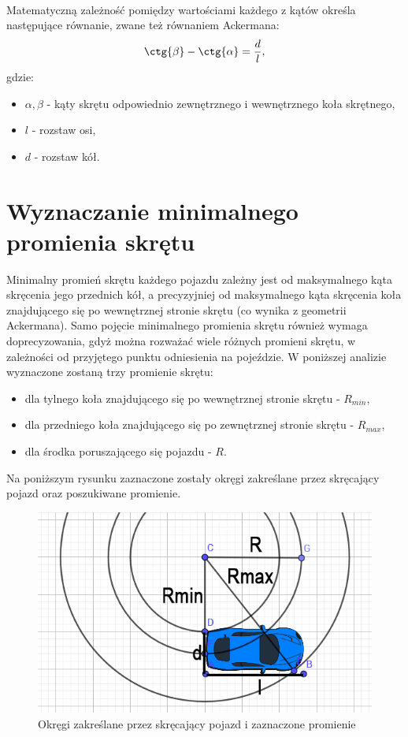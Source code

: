 \documentclass[a4paper,11pt,twoside]{report}
\theoremstyle{definition}
\begin{document}
~\\Matematyczną zależność pomiędzy wartościami każdego z kątów określa następujące równanie, zwane też równaniem Ackermana:
$$
\ctg{\beta} - \ctg{\alpha} = \frac{d}{l},
$$
gdzie:
\begin{itemize}
	\item $\alpha, \beta$ - kąty skrętu odpowiednio zewnętrznego i wewnętrznego koła skrętnego,
	\item $l$ - rozstaw osi,
	\item $d$ - rozstaw kół.
\end{itemize}
\newpage

\section{Wyznaczanie minimalnego promienia skrętu}

Minimalny promień skrętu każdego pojazdu zależny jest od maksymalnego kąta skręcenia jego przednich kół, a precyzyjniej od maksymalnego kąta skręcenia koła znajdującego się po wewnętrznej stronie skrętu (co wynika z geometrii Ackermana). Samo pojęcie minimalnego promienia skrętu również wymaga doprecyzowania, gdyż można rozważać wiele różnych promieni skrętu, w zależności od przyjętego punktu odniesienia na pojeździe. W poniższej analizie wyznaczone zostaną trzy promienie skrętu:
\begin{itemize}
	\item dla tylnego koła znajdującego się po wewnętrznej stronie skrętu - $R_{min}$,
	\item dla przedniego koła znajdującego się po zewnętrznej stronie skrętu - $R_{max}$,
	\item dla środka poruszającego się pojazdu - $R$.
\end{itemize}

Na poniższym rysunku zaznaczone zostały okręgi zakreślane przez skręcający pojazd oraz poszukiwane promienie.

\begin{figure}[h!]
\centering
\includegraphics[scale=0.4]{vehicleTurningRadius}
\caption[Okręgi zakreślane przez skręcający pojazd i zaznaczone promienie]{Okręgi zakreślane przez skręcający pojazd i zaznaczone promienie}
\end{figure}
\end{document}
